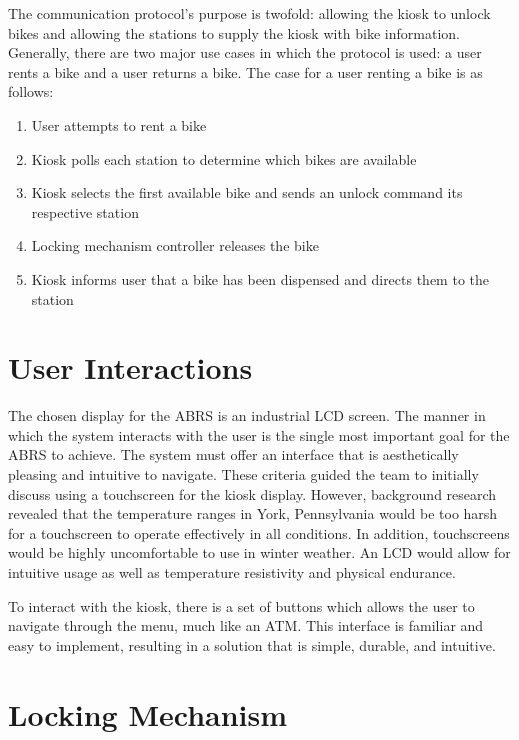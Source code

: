 \documentclass[11pt,a4paper,onesides]{report}
\begin{document}
The communication protocol's purpose is twofold: allowing the kiosk to unlock bikes and allowing the stations to supply the kiosk with bike information.  Generally, there are two major use cases in which the protocol is used: a user rents a bike and a user returns a bike.  The case for a user renting a bike is as follows: 

\begin{enumerate}

  \item User attempts to rent a bike
  \item Kiosk polls each station to determine which bikes are available
  \item Kiosk selects the first available bike and sends an unlock command its respective station
  \item Locking mechanism controller releases the bike
  \item Kiosk informs user that a bike has been dispensed and directs them to the station

\end{enumerate}

\section{User Interactions}

The chosen display for the ABRS is an industrial LCD screen.  The manner in which the system interacts with the user is the single most important goal for the ABRS to achieve.  The system must offer an interface that is aesthetically pleasing and intuitive to navigate.  These criteria guided the team to initially discuss using a touchscreen for the kiosk display.  However, background research revealed that the temperature ranges in York, Pennsylvania would be too harsh for a touchscreen to operate effectively in all conditions.  In addition, touchscreens would be highly uncomfortable to use in winter weather.  An LCD would allow for intuitive usage as well as temperature resistivity and physical endurance.

To interact with the kiosk, there is a set of buttons which allows the user to navigate through the menu, much like an ATM.  This interface is familiar and easy to implement, resulting in a solution that is simple, durable, and intuitive.  


\section{Locking Mechanism}
\end{document}
